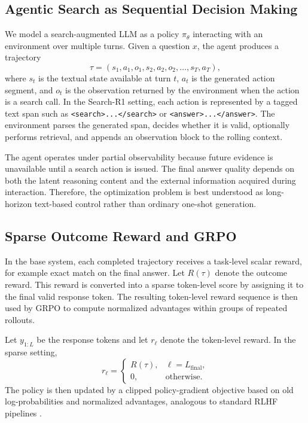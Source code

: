 \documentclass[11pt]{article}
\newcommand{\grpo}{GRPO}
\newcommand{\searchr}{Search-R1}
\begin{document}
\subsection{Agentic Search as Sequential Decision Making}
We model a search-augmented LLM as a policy $\pi_{\theta}$ interacting with an environment over multiple turns. Given a question $x$, the agent produces a trajectory
\begin{equation}
\tau = (s_1, a_1, o_1, s_2, a_2, o_2, \dots, s_T, a_T),
\end{equation}
where $s_t$ is the textual state available at turn $t$, $a_t$ is the generated action segment, and $o_t$ is the observation returned by the environment when the action is a search call. In the \searchr{} setting, each action is represented by a tagged text span such as \texttt{<search>...</search>} or \texttt{<answer>...</answer>}. The environment parses the generated span, decides whether it is valid, optionally performs retrieval, and appends an observation block to the rolling context.

The agent operates under partial observability because future evidence is unavailable until a search action is issued. The final answer quality depends on both the latent reasoning content and the external information acquired during interaction. Therefore, the optimization problem is best understood as long-horizon text-based control rather than ordinary one-shot generation.

\subsection{Sparse Outcome Reward and \grpo{}}
In the base system, each completed trajectory receives a task-level scalar reward, for example exact match on the final answer. Let $R(\tau)$ denote the outcome reward. This reward is converted into a sparse token-level score by assigning it to the final valid response token. The resulting token-level reward sequence is then used by \grpo{} to compute normalized advantages within groups of repeated rollouts.

Let $y_{1:L}$ be the response tokens and let $r_{\ell}$ denote the token-level reward. In the sparse setting,
\begin{equation}
r_{\ell} =
\begin{cases}
R(\tau), & \ell = L_{\text{final}},\\
0, & \text{otherwise}.
\end{cases}
\end{equation}
The policy is then updated by a clipped policy-gradient objective based on old log-probabilities and normalized advantages, analogous to standard RLHF pipelines \citep{schulman2017ppo,deepseekr1}.
\end{document}
